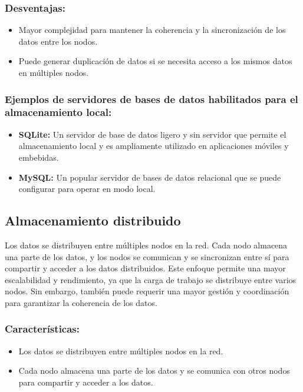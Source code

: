 \subsubsection{Desventajas:}
\noindent
\begin{itemize}
	\item Mayor complejidad para mantener la coherencia y la sincronización de los datos entre los nodos.
	\item Puede generar duplicación de datos si se necesita acceso a los mismos datos en múltiples nodos.
\end{itemize}

\subsubsection{Ejemplos de servidores de bases de datos habilitados para el almacenamiento local:}
\noindent
\begin{itemize}
	\item \textbf{SQLite:} Un servidor de base de datos ligero y sin servidor que permite el almacenamiento local y es ampliamente utilizado en aplicaciones móviles y embebidas.
	\item \textbf{MySQL:} Un popular servidor de bases de datos relacional que se puede configurar para operar en modo local.
\end{itemize}

\subsection{Almacenamiento distribuido}
\noindent
Los datos se distribuyen entre múltiples nodos en la red. Cada nodo almacena una parte de los datos, y los nodos se comunican y se sincronizan entre sí para compartir y acceder a los datos distribuidos. Este enfoque permite una mayor escalabilidad y rendimiento, ya que la carga de trabajo se distribuye entre varios nodos. Sin embargo, también puede requerir una mayor gestión y coordinación para garantizar la coherencia de los datos.

\subsubsection{Características:}
\noindent
\begin{itemize}
	\item Los datos se distribuyen entre múltiples nodos en la red.
	\item Cada nodo almacena una parte de los datos y se comunica con otros nodos para compartir y acceder a los datos.
\end{itemize}
